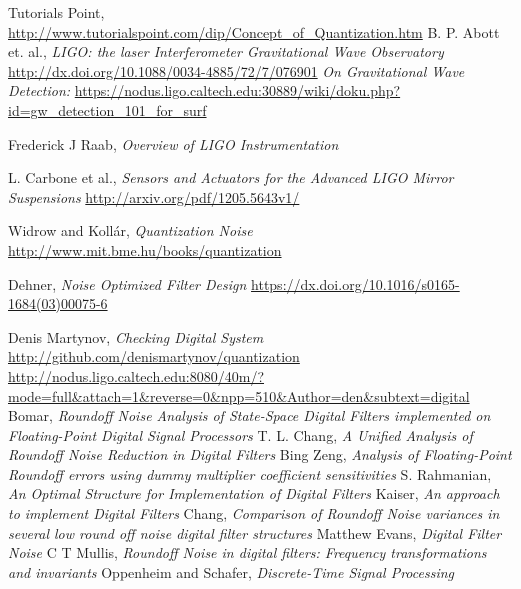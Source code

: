 \begin{thebibliography}{100}  

 Tutorials Point, \url{http://www.tutorialspoint.com/dip/Concept_of_Quantization.htm}
 B. P. Abott et. al.,  
				\emph{LIGO: the laser Interferometer Gravitational Wave Observatory} 							\url{http://dx.doi.org/10.1088/0034-4885/72/7/076901}
 \emph{On Gravitational Wave Detection: }
			\url{https://nodus.ligo.caltech.edu:30889/wiki/doku.php?id=gw_detection_101_for_surf}

 Frederick J Raab, \emph{Overview of LIGO Instrumentation}

 L. Carbone et al., \emph{Sensors and Actuators for the Advanced LIGO Mirror Suspensions}
									\url{http://arxiv.org/pdf/1205.5643v1/}
									
 Widrow and Koll\'ar, \emph{Quantization Noise} 				\url{http://www.mit.bme.hu/books/quantization}

 Dehner, \emph{Noise Optimized Filter Design} 		\url{https://dx.doi.org/10.1016/s0165-1684(03)00075-6}


 Denis Martynov, \emph{Checking Digital System} \url{http://github.com/denismartynov/quantization}
\url{http://nodus.ligo.caltech.edu:8080/40m/?mode=full&attach=1&reverse=0&npp=510&Author=den&subtext=digital}  
 Bomar, \emph{Roundoff Noise Analysis of State-Space Digital Filters implemented on Floating-Point Digital Signal Processors}
 T. L. Chang, \emph{A Unified Analysis of Roundoff Noise Reduction in Digital Filters}
 Bing Zeng, \emph{Analysis of Floating-Point Roundoff errors using dummy multiplier coefficient sensitivities}
 S. Rahmanian, \emph{An Optimal Structure for Implementation of Digital Filters}
 Kaiser, \emph{An approach to implement Digital Filters}
 Chang, \emph{Comparison of Roundoff Noise variances in several low round off noise digital filter structures}
 Matthew Evans, \emph{Digital Filter Noise}
C T Mullis, \emph{Roundoff Noise in digital filters: Frequency transformations and invariants}
 Oppenheim and Schafer, \emph{Discrete-Time Signal Processing}


\end{thebibliography}
